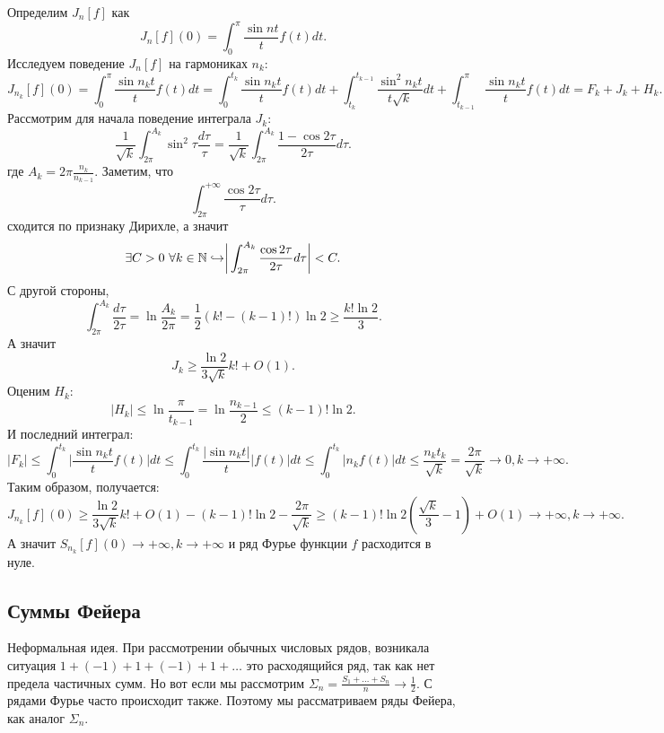 \begin{example}[Шварц]
    Определим $J_n[f]$ как \[
                               J_n[f](0) = \int_0^\pi \dfrac{\sin nt}{t}f(t)dt.
    \]
    Исследуем поведение $J_n[f]$ на гармониках $n_k$:
    \[
        J_{n_k}[f](0) = \int_0^\pi \dfrac{\sin n_kt}{t}f(t)dt = \int_0^{t_k}\dfrac{\sin n_kt }{t}f(t)dt + \int_{t_k}^{t_{k - 1}}\dfrac{\sin^2 n_kt}{t \sqrt{k}}dt + \int_{t_{k - 1}}^\pi \dfrac{\sin n_kt}{t}f(t)dt = F_k + J_k + H_k.
    \]
    Рассмотрим для начала поведение интеграла $J_k$:
    \[
        \dfrac{1}{\sqrt{k}}\int_{2\pi}^{A_k}\sin^2 \tau \dfrac{d\tau}{\tau} = \dfrac{1}{\sqrt{k}}\int_{2\pi}^{A_k}\dfrac{1 - \cos 2\tau}{2\tau}d\tau.
    \]
    где $A_k = 2\pi \frac{n_k}{n_{k - 1}}$. Заметим, что \[
                                                             \int_{2\pi}^{+\infty}\dfrac{\cos 2\tau}{\tau}d\tau.
    \]
    сходится по признаку Дирихле, а значит \[
                                               \exists C > 0 \ \forall k \in \mathbb{N} \hookrightarrow \biggr|\int_{2\pi}^{A_k} \dfrac{\cos 2\tau}{2\tau}d\tau\biggr| < C.
    \]
    С другой стороны, \[
                          \int_{2\pi}^{A_k} \dfrac{d\tau}{2\tau} = \ln \dfrac{A_k}{2\pi} = \dfrac{1}{2}(k! - (k - 1)!)\ln 2 \geq \dfrac{k! \ln 2}{3}.
    \]
    А значит \[
                 J_k \geq \dfrac{\ln 2}{3\sqrt{k}}k! + O(1).
    \]
    Оценим $H_k$: \[
                      |H_k| \leq \ln \dfrac{\pi}{t_{k - 1}} = \ln \dfrac{n_{k - 1}}{2} \leq (k - 1)!\ln 2.
    \]
    И последний интеграл: \[
                              |F_k| \leq \int_0^{t_k} \biggr|\dfrac{\sin n_kt}{t}f(t)\biggr|dt \leq \int_0^{t_{k}}\dfrac{|\sin n_kt|}{t}|f(t)|dt \leq \int_0^{t_k}|n_kf(t)|dt \leq \dfrac{n_k t_k}{\sqrt{k}} = \dfrac{2\pi}{\sqrt{k}} \rightarrow 0, k \rightarrow +\infty.
    \]
    Таким образом, получается: \[
                                   J_{n_k}[f](0) \geq \dfrac{\ln 2}{3\sqrt{k}}k! + O(1) - (k - 1)!\ln 2 - \dfrac{2\pi }{\sqrt{k}} \geq (k - 1)!\ln 2(\dfrac{\sqrt{k}}{3} - 1) + O(1) \rightarrow +\infty, k \rightarrow +\infty.
    \]
    А значит $S_{n_k}[f](0) \rightarrow +\infty, k \rightarrow +\infty$ и ряд Фурье функции $f$ расходится в нуле.
\end{example}
\subsection{Суммы Фейера}
Неформальная идея. При рассмотрении обычных числовых рядов, возникала ситуация $1 + (-1) + 1 + (-1) + 1  + \dots$ это расходящийся ряд, так как нет предела частичных сумм. Но вот если мы рассмотрим $\Sigma_n = \frac{S_1 +\dots +S_n}{n} \to \frac{1}{2}$. С рядами Фурье часто происходит также. Поэтому мы рассматриваем ряды Фейера, как аналог $\Sigma_n$.


